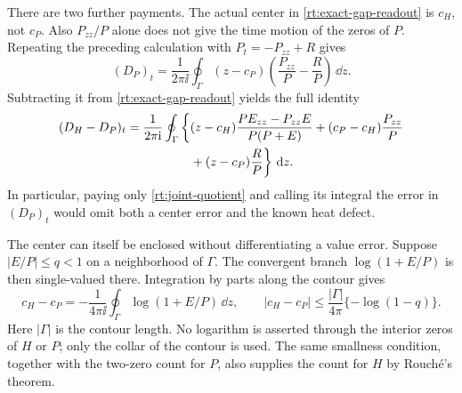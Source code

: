 There are two further payments.  The actual center in
\eqref{rt:exact-gap-readout} is $c_H$, not $c_P$.  Also $P_{zz}/P$
alone does not give the time motion of the zeros of $P$.  Repeating
the preceding calculation with $P_t=-P_{zz}+R$ gives
\begin{equation}
 (D_P)_t=\frac1{2\pi\ii}\oint_\Gamma
                   (z-c_P)\left(\frac{P_{zz}}P-\frac RP\right)\,\dd z.
 \label{rt:reference-gap-readout}
\end{equation}
Subtracting it from \eqref{rt:exact-gap-readout} yields the full identity
\begin{align}
 (D_H-D_P)_t=\frac1{2\pi\mathrm i}\oint_\Gamma
 \bigg\{&(z-c_H)\frac{P E_{zz}-P_{zz}E}{P(P+E)}
       +(c_P-c_H)\frac{P_{zz}}P\notag\\
       &+(z-c_P)\frac RP\bigg\}\,\,\mathrm d z.
 \label{rt:full-gap-error}
\end{align}
In particular, paying only \eqref{rt:joint-quotient} and calling its
integral the error in $(D_P)_t$ would omit both a center error and the
known heat defect.

The center can itself be enclosed without differentiating a value
error.  Suppose $|E/P|\le q<1$ on a neighborhood of $\Gamma$.
The convergent branch $\log(1+E/P)$ is then single-valued there.
Integration by parts along the contour gives
\begin{equation}
 c_H-c_P=-\frac1{4\pi\ii}\oint_\Gamma
                          \log(1+E/P)\,\dd z,
 \qquad
 |c_H-c_P|\le\frac{|\Gamma|}{4\pi}\{-\log(1-q)\}.
 \label{rt:center-bound}
\end{equation}
Here $|\Gamma|$ is the contour length.  No logarithm is asserted through
the interior zeros of $H$ or $P$; only the collar of the contour is used.
The same smallness condition, together with the two-zero count for $P$,
also supplies the count for $H$ by Rouch\'e's theorem.

